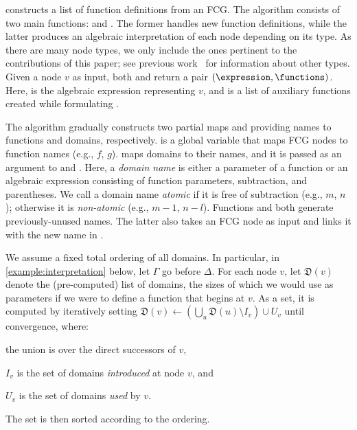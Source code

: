 \documentclass{article}
\begin{document}
 constructs a list of function definitions from an
FCG\@. The algorithm consists of two main functions: \visit and \actuallyVisit.
The former handles new function definitions, while the latter produces an
algebraic interpretation of each node depending on its type. As there are many
node types, we only include the ones pertinent to the contributions of this
paper; see previous work~\cite{DBLP:conf/ijcai/BroeckTMDR11} for information
about other types. Given a node $v$ as input, both \visit and \actuallyVisit
return a pair $(\expression, \functions)$. Here, \expression is the algebraic
expression representing $v$, and \functions is a list of auxiliary functions
created while formulating \expression.

The algorithm gradually constructs two partial maps \functionNames and
\domainNames providing names to functions and domains, respectively.
\functionNames is a global variable that maps FCG nodes to function names (e.g.,
$f$, $g$). \domainNames maps domains to their names, and it is passed as an
argument to \visit and \actuallyVisit. Here, a \emph{domain name} is either a
parameter of a function or an algebraic expression consisting of function
parameters, subtraction, and parentheses. We call a domain name \emph{atomic} if
it is free of subtraction (e.g., $m$, $n$); otherwise it is \emph{non-atomic}
(e.g., $m-1$, $n-l$). Functions \newDomainName and \newFunctionName both
generate previously-unused names. The latter also takes an FCG node as input and
links it with the new name in \functionNames.

We assume a fixed total ordering of all domains. In particular, in
\cref{example:interpretation} below, let $\Gamma$ go before $\Delta$. For each
node $v$, let $\mathfrak{D}(v)$ denote the (pre-computed) list of domains, the
sizes of which we would use as parameters if we were to define a function that
begins at $v$. As a set, it is computed by iteratively setting
$\mathfrak{D}(v) \gets \left(\bigcup_{u} \mathfrak{D}(u) \setminus I_{v}\right) \cup U_{v}$
until convergence, where:
\begin{enumerate*}[label=(\roman*)]
  \item the union is over the direct successors of $v$,
  \item $I_{v}$ is the set of domains \emph{introduced} at node $v$, and
  \item $U_{v}$ is the set of domains \emph{used} by $v$.
\end{enumerate*}
The set is then sorted according to the ordering.
\end{document}
